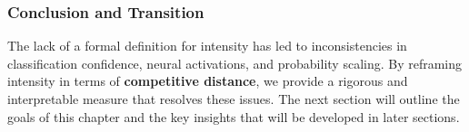 
\subsubsection{Conclusion and Transition}

The lack of a formal definition for intensity has led to inconsistencies in classification confidence, neural activations, and probability scaling. By reframing intensity in terms of \textbf{competitive distance}, we provide a rigorous and interpretable measure that resolves these issues. The next section will outline the goals of this chapter and the key insights that will be developed in later sections.
